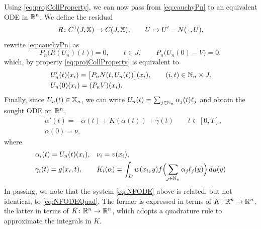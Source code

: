 \documentclass[a4paper]{siamart190516}
\begin{document}
Using \cref{eq:projCollProperty}, we can now pass from \cref{eq:cauchyPn} to an
equivalent ODE in $\mathbb{R}^n$. We define the residual
\[
  R \colon C^1(J,\mathbb{X}) \to C(J,\mathbb{X}), \qquad U \mapsto U' - N({\mkern 2mu\cdot\mkern 2mu}, U),
\]
rewrite \cref{eq:cauchyPn} as
\[
  P_n \bigl( R(U_n)(t) \bigr) = 0, \qquad t \in J, \qquad 
  P_n \bigl( U_n(0) - V\bigr) = 0, 
\]
which, by property \cref{eq:projCollProperty} is equivalent to
\[
  \begin{aligned}
  & U'_n(t)(x_i) = \bigl[P_n N(t,U_n(t))\bigr](x_i), \qquad (i,t) \in \mathbb{N}_n \times J, \\
  & U_n(0)(x_i) = (P_n V)(x_i).
  \end{aligned}
\]
Finally, since $U_n(t) \in \mathbb{X}_n$, we can write $U_n(t) = \sum_{j \in \mathbb{N}_n}
\alpha_j(t) \ell_j$ and obtain the sought ODE on $\mathbb{R}^n$,
\begin{equation} \label{eq:NFODE}
  \begin{aligned}
   & \alpha'(t) = -\alpha(t) + K(\alpha(t)) + \gamma(t) \qquad  t \in [0,T],\\ 
   & \alpha (0) = \nu,
  \end{aligned}
\end{equation}  
where 
\[
  \begin{aligned}
  & \alpha_i(t) = U_n(t)(x_i), && \nu_i = v(x_i),  \\
  & \gamma_i(t) = g(x_i,t),
  && K_i(\alpha) = 
    \int_{D}w(x_i,y) f\Bigl( \sum_{j \in \mathbb{N}_n} \alpha_j \ell_j(y)\Bigr) \, d\mu(y)
  \end{aligned}
\]
In passing, we note that the system \cref{eq:NFODE} above is related, but not
identical, to \cref{eq:NFODEQuad}. The former is expressed in terms of 
$K \colon \mathbb{R}^n \to \mathbb{R}^n$, the latter in terms of
$\tilde K \colon \mathbb{R}^n \to \mathbb{R}^n$, which adopts a quadrature rule to approximate
the integrals in $K$. 
\end{document}
